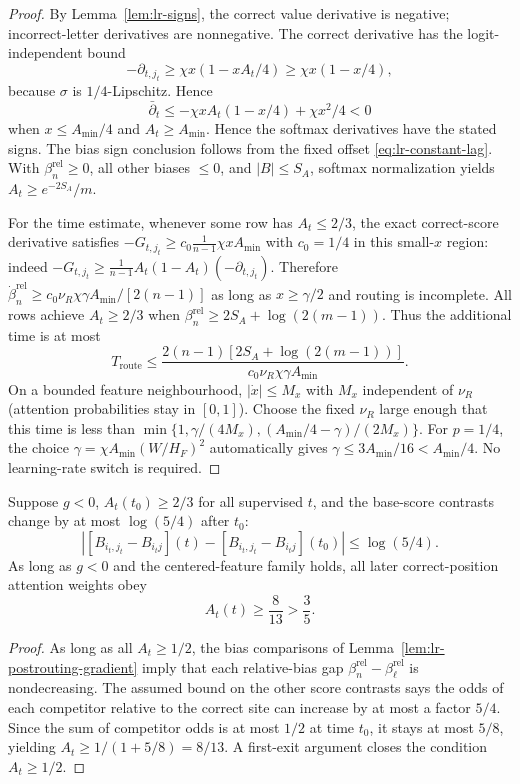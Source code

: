 \begin{proof}
By Lemma~\ref{lem:lr-signs}, the correct value derivative is negative;
incorrect-letter derivatives are nonnegative.  The correct derivative has the logit-independent bound
\[
 -\partial_{t,j_t}\ge\chi x(1-xA_t/4)\ge\chi x(1-x/4),
\]
because $\sigma$ is $1/4$-Lipschitz. Hence
\[
 \bar\partial_t\le-\chi x A_t(1-x/4)+\chi x^2/4<0
\]
when $x\le A_{\min}/4$ and $A_t\ge A_{\min}$.  Hence the softmax derivatives have the stated signs.
The bias sign conclusion follows from the fixed offset
\eqref{eq:lr-constant-lag}.
With $\beta_n^{\mathrm{rel}}\ge0$, all other biases $\le0$,
and $|B|\le S_A$, softmax normalization yields
$A_t\ge e^{-2S_A}/m$.

For the time estimate, whenever some row has $A_t\le2/3$, the exact
correct-score derivative satisfies
$-G_{t,j_t}\ge c_0\frac1{n-1}\chi xA_{\min}$
with $c_0=1/4$ in this small-$x$ region: indeed
$-G_{t,j_t}\ge\frac1{n-1} A_t(1-A_t)(-\partial_{t,j_t})$.
Therefore
$\dot\beta_n^{\mathrm{rel}}
\ge c_0\nu_R\chi\gamma A_{\min}/[2(n-1)]$
as long as $x\ge\gamma/2$ and routing is incomplete.
All rows achieve $A_t\ge2/3$ when
$\beta_n^{\mathrm{rel}}\ge
2S_A+\log(2(m-1))$.
Thus the additional time is at most
\[
 T_{\mathrm{route}}
 \le \frac{2(n-1)[2S_A+\log(2(m-1))]}
 {c_0\nu_R\chi\gamma A_{\min}}.
\]
On a bounded feature neighbourhood, $|\dot x|\le M_x$ with $M_x$
independent of $\nu_R$ (attention probabilities stay in $[0,1]$).
Choose the fixed $\nu_R$ large enough that this time is less than
$\min\{1,\gamma/(4M_x),(A_{\min}/4-\gamma)/(2M_x)\}$.
For $p=1/4$, the choice $\gamma=\chi A_{\min}(W/H_F)^2$
automatically gives $\gamma\le3A_{\min}/16<A_{\min}/4$.
No learning-rate switch is required.
\end{proof}

\begin{lrlemma}
\label{lem:lr-post-routing}
Suppose $g<0$, $A_t(t_0)\ge2/3$ for all supervised $t$, and the
base-score contrasts change by at most $\log(5/4)$ after $t_0$:
\[
 |[B_{i_t,j_t}-B_{i_tj}](t)-[B_{i_t,j_t}-B_{i_tj}](t_0)|
 \le\log(5/4).
\]
As long as $g<0$ and the centered-feature family holds, all later
correct-position attention weights obey
\begin{equation}\label{eq:lr-post-floor}
 A_t(t)\ge\frac8{13}>\frac35.
\end{equation}
\end{lrlemma}
\begin{proof}
As long as all $A_t\ge1/2$, the bias comparisons of
Lemma~\ref{lem:lr-postrouting-gradient} imply that each relative-bias
gap $\beta_n^{\mathrm{rel}}-\beta_\ell^{\mathrm{rel}}$ is
nondecreasing.  The assumed bound on the other score contrasts says
the odds of each competitor relative to the correct site can increase
by at most a factor $5/4$.  Since the sum of competitor odds is at most
$1/2$ at time $t_0$, it stays at most $5/8$, yielding
$A_t\ge1/(1+5/8)=8/13$.  A first-exit argument closes the condition
$A_t\ge1/2$.
\end{proof}

